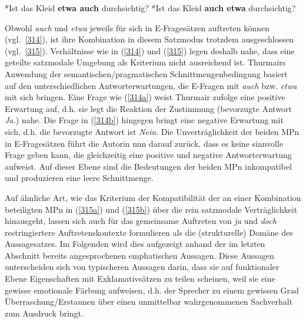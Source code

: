 \begin{exe}
	\ex\label{315} 
		\begin{xlist}	
			\ex\label{315a} *Ist das Kleid \textbf{etwa auch} durchsichtig?
			\hfill\hbox{\citet[27]{Thurmair1991}}
			\ex\label{315b} *Ist das Kleid \textbf{auch etwa} durchsichtig?
		\end{xlist}
\end{exe}
Obwohl \textit{auch} und \textit{etwa} jeweils für sich in E-Fragesätzen auftreten können (vgl.\ \ref{314}), ist ihre Kombination in diesem Satzmodus trotzdem ausgeschlossen (vgl.\ \ref{315}). Verhältnisse wie in (\ref{314}) und (\ref{315}) legen deshalb nahe, dass eine geteilte satzmodale Umgebung als Kriterium nicht ausreichend ist. Thurmairs Anwendung der semantischen/pragmatischen Schnittmengenbedingung basiert auf den unterschiedlichen Antworterwartungen, die E-Fragen mit \textit{auch} bzw. \textit{etwa} mit sich bringen. Eine Frage wie (\ref{314a}) weist Thurmair zufolge eine positive Erwartung auf, d.h. sie legt die Reaktion der Zustimmung (bevorzugte Antwort  \textit{Ja.}) nahe. Die Frage in (\ref{314b}) hingegen bringt eine negative Erwartung mit sich, d.h. die bevorzugte Antwort ist \textit{Nein}. Die Unverträglichkeit der beiden MPn in E-Fragesät\-zen führt die Autorin nun darauf zurück, dass es keine sinnvolle Frage geben kann, die gleichzeitig eine positive und negative Antworterwartung aufweist. Auf dieser Ebene sind die Bedeutungen der beiden MPn inkompatibel und produzieren eine leere Schnittmenge.			        
								               
Auf ähnliche Art, wie das Kriterium der Kompatibilität der an einer Kombination beteiligten MPn in (\ref{315a}) und (\ref{315b}) über die rein satzmodale Verträglichkeit hinausgeht, lassen sich auch für das gemeinsame Auftreten von \textit{ja} und \textit{doch} restringiertere Auftretenskontexte formulieren als die (strukturelle) Domäne des Aussagesatzes. Im Folgenden wird dies aufgezeigt anhand der im letzten Abschnitt bereits angesprochenen  emphatischen Aussagen. Diese Aussagen unterscheiden sich von typischeren Aussagen darin, dass sie auf funktionaler Ebene Eigenschaften mit Exklamativsätzen zu teilen scheinen, weil sie eine gewisse emotionale Färbung aufweisen, d.h. der Sprecher zu einem gewissen Grad Überraschung/Erstaunen über einen unmittelbar wahrgenommenen Sachverhalt zum Ausdruck bringt.
			   					         
